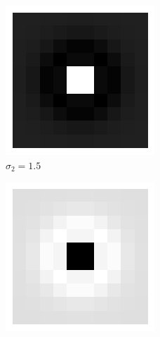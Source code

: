 \documentclass[12pt]{article}
\begin{document}
	\begin{figure}[H]
\centering
	\begin{subfigure}[b]{0.17\textwidth}
    \includegraphics[width=\textwidth]{Figs/s11s21.5.png}
    \caption*{$\sigma_2 = 1.5$}
  \end{subfigure}
  \hspace{10}
  \begin{subfigure}[b]{0.17\textwidth}
    \includegraphics[width=\textwidth]{Figs/s11s21.52.png}

\end{subfigure}
\end{figure}
\end{document}
